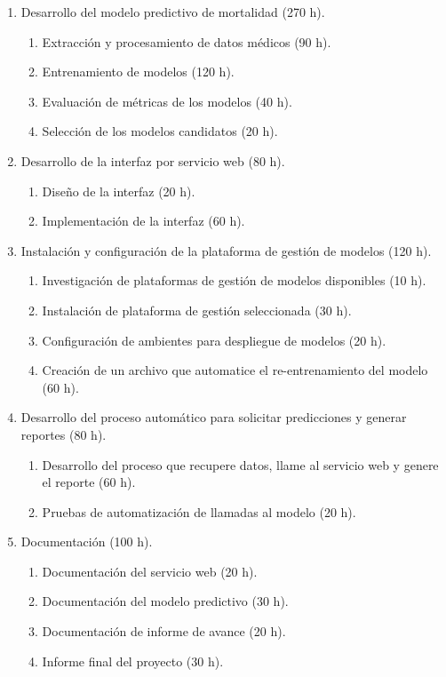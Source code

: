 \documentclass[
11pt, %
]{charter}
\begin{document}
\begin{enumerate}
\item Desarrollo del modelo predictivo de mortalidad (270 h).
	\begin{enumerate}
	\item Extracción y procesamiento de datos médicos (90 h).
	\item Entrenamiento de modelos (120 h).
	\item Evaluación de métricas de los modelos (40 h).
	\item Selección de los modelos candidatos (20 h).
	\end{enumerate}
\item Desarrollo de la interfaz por servicio web (80 h).
	\begin{enumerate}
	\item Diseño de la interfaz (20 h).
	\item Implementación de la interfaz (60 h).
	\end{enumerate}
\item Instalación y configuración de la plataforma de gestión de modelos (120 h).
	\begin{enumerate}
	\item Investigación de plataformas de gestión de modelos disponibles (10 h).
	\item Instalación de plataforma de gestión seleccionada (30 h).
	\item Configuración de ambientes para despliegue de modelos (20 h).
	\item Creación de un archivo que automatice el re-entrenamiento del modelo (60 h).
	\end{enumerate}
\item Desarrollo del proceso automático para solicitar predicciones y generar reportes (80 h).
	\begin{enumerate}
	\item Desarrollo del proceso que recupere datos, llame al servicio web y genere el reporte (60 h).
	\item Pruebas de automatización de llamadas al modelo (20 h).
	\end{enumerate}
\item Documentación (100 h).
	\begin{enumerate}
	\item Documentación del servicio web (20 h).
	\item Documentación del modelo predictivo (30 h).
	\item Documentación de informe de avance (20 h).
	\item Informe final del proyecto (30 h).
	\end{enumerate}
\end{enumerate}
\end{document}

